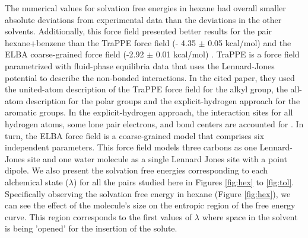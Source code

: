 The numerical values for solvation free energies in hexane had overall smaller absolute deviations from experimental data than the deviations in the other solvents. Additionally, this force field presented better results for the pair hexane+benzene than the TraPPE force field (- 4.35  $\pm$ 0.05 kcal/mol) \cite{garrido2011} and the ELBA coarse-grained force field  (-2.92 $\pm$ 0.01 kcal/mol) \cite{doi:10.1021/acs.jctc.5b00963}. TraPPE is a force field parametrized with fluid-phase equilibria data that uses the Lennard-Jones potential to describe the non-bonded interactions. In the cited paper, they used the united-atom description of the TraPPE force field for the alkyl group, the all-atom description for the polar groups and the explicit-hydrogen approach for the aromatic groups. In the explicit-hydrogen approach, the interaction sites for all hydrogen atoms, some lone pair electrons, and bond centers are accounted for \cite{doi:10.1021/jp073586l}. In turn, the ELBA force field is a coarse-grained model that comprises six independent parameters. This force field models three carbons as one Lennard-Jones site and one water molecule as a single Lennard Jones site with a point dipole. We also present the solvation free energies corresponding to each alchemical state ($\lambda$) for all the pairs studied here in Figures \ref{fig:hex} to \ref{fig:tol}. Specifically observing the solvation free energy in hexane (Figure \ref{fig:hex}), we can see the effect of the molecule's size on the entropic region of the free energy curve. This region corresponds to the first values of $\lambda$ where space in the solvent is being 'opened' for the insertion of the solute.

